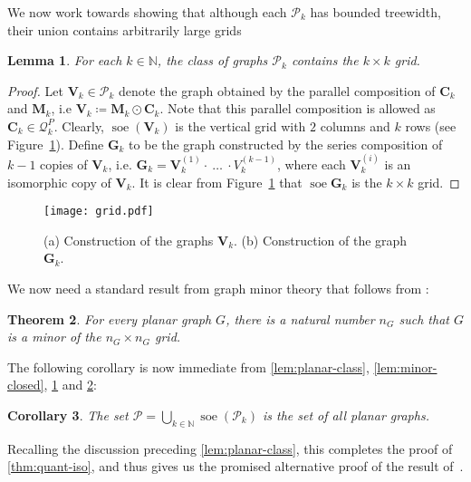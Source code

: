 \documentclass[11pt,a4paper]{article}
\theoremstyle{plain}
\newtheorem{thm}{Theorem}[section]
\newtheorem{cor}[thm]{Corollary}
\newtheorem{lem}[thm]{Lemma}
\theoremstyle{remark}
\theoremstyle{definition}
\DeclareMathOperator{\soe}{soe}
\def\calP{{\mathcal P}} \def\calQ{{\mathcal Q}} \def\calR{{\mathcal R}}
\begin{document}
We now work towards showing that although each $\calP_k$ has bounded treewidth, their union contains arbitrarily large grids  

\begin{lem}\label{lem:unbounded-tw}
     For each $k \in \mathbb{N}$, the class of graphs $\calP_k$ contains the $k \times k$ grid.   
\end{lem}
\begin{proof}
  Let $\boldsymbol{V}_k \in \calP_k$ denote the graph obtained by the parallel composition of $\boldsymbol{C}_k$ and $\boldsymbol{M}_k$, i.e $\boldsymbol{V}_k \coloneqq \boldsymbol{M}_k \odot \boldsymbol{C}_k$. Note that this parallel composition is allowed as $\boldsymbol{C}_k \in \calQ_k^P$. Clearly, $\soe(\boldsymbol{V}_k)$ is the vertical grid with $2$ columns and $k$ rows (see Figure~\ref{fig:grid}). Define $\boldsymbol{G}_k$ to be the graph constructed by the series composition of $k-1$ copies of $\boldsymbol{V}_k$, i.e. $\boldsymbol{G}_k = \boldsymbol{V}_k^{(1)} \cdot \ \dots \ \cdot V_k^{(k-1)}$, 
  where each $\boldsymbol{V}_k^{(i)}$ is an isomorphic copy of $\boldsymbol{V}_k$. It is clear from Figure~\ref{fig:grid} that $\soe \boldsymbol{G}_k$ is the $k \times k$ grid. 
\end{proof}

\begin{figure}[b]
  \centering
  \texttt{[image: grid.pdf]}
  \caption{(a) Construction of the graphs $\boldsymbol{V}_k$. (b) Construction of the graph $\boldsymbol{G}_k$.}
  \label{fig:grid}
\end{figure}

We now need a standard result from graph minor theory that follows from \cite{robertson-seymour-3}:

\begin{thm}\label{thm:graph-minor-theory}
    For every planar graph $G$, there is a natural number $n_G$ such that $G$ is a minor of the $n_G \times n_G$ grid. 
\end{thm}

The following corollary is now immediate from \cref{lem:planar-class}, \cref{lem:minor-closed}, \cref{lem:unbounded-tw} and \cref{thm:graph-minor-theory}:

\begin{cor}\label{cor:alt-proof}
     The set $\calP = \bigcup_{k \in \mathbb{N}}\soe(\calP_k)$ is the set of all planar graphs.  
\end{cor}

Recalling the discussion preceding \cref{lem:planar-class}, this completes the proof of \cref{thm:quant-iso}, and thus gives us the promised alternative proof of the result of~\cite{david-laura}. 
\end{document}
